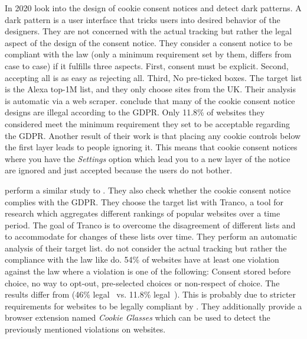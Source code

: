 In 2020  look into the design of cookie consent notices and detect dark patterns. A dark pattern is
a user interface that tricks users into desired behavior of the designers. They are not
concerned with the actual tracking but rather the legal aspect of the design of the consent notice. They consider a
consent notice to be compliant with the law (only a minimum requirement set by them, differs from case to case) if it
fulfills three aspects. First, consent must be explicit. Second, accepting all is as easy as rejecting all. Third, No
pre-ticked boxes. The target list is
the Alexa top-1M list, and they only choose sites from the UK. Their analysis is automatic via a web scraper.
\citeauthor{nouwens2020dark} conclude that many of the cookie consent notice designs are illegal according to the GDPR.
Only 11.8\% of websites they considered meet the minimum requirement they set to be acceptable regarding the GDPR.
Another result of their work is that placing any cookie controls below the first layer leads to people ignoring it. This
means that cookie consent notices where you have the \emph{Settings} option which lead you to a new layer of the notice
are ignored and just accepted because the users do not bother.

 perform a similar study to . They also check whether the cookie consent notice
complies with the GDPR. They choose the target list with Tranco, a tool for research which aggregates different rankings
of popular websites over a time period. The goal of Tranco is to overcome the disagreement of different lists and to accommodate
for changes of these lists over time. They perform an automatic analysis of their target list.
\citeauthor{matte2020cookie} do not consider the actual tracking but rather the compliance with the law
like \citeauthor{nouwens2020dark} do. 54\% of websites have at least one violation against the law where a violation is
one of the following: Consent stored before choice, no way to opt-out, pre-selected choices or non-respect of choice.
The results differ from \citeauthor{nouwens2020dark}(46\% legal~\cite{matte2020cookie} vs. 11.8\%
legal~\cite{nouwens2020dark}). This is probably due to stricter
requirements for websites to be legally compliant by \citeauthor{nouwens2020dark}.
They additionally provide a browser extension named \emph{Cookie Glasses} which can be used to detect the previously
mentioned violations on websites.

